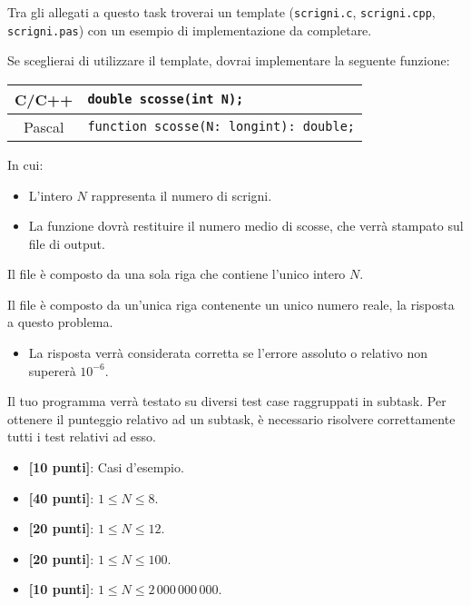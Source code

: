 \begin{warning}
Tra gli allegati a questo task troverai un template (\texttt{scrigni.c}, \texttt{scrigni.cpp}, \texttt{scrigni.pas}) con un esempio di implementazione da completare.
\end{warning}

Se sceglierai di utilizzare il template, dovrai implementare la seguente funzione:
\begin{center}\begin{tabularx}{\textwidth}{|c|X|}
\hline
C/C++  & \verb|double scosse(int N);|\\
\hline
Pascal & \verb|function scosse(N: longint): double;|\\
\hline
\end{tabularx}\end{center}
In cui:
\begin{itemize}[nolistsep]
  \item L'intero $N$ rappresenta il numero di scrigni.
  \item La funzione dovrà restituire il numero medio di scosse, che verrà stampato sul file di output.
\end{itemize}

\InputFile
Il file  è composto da una sola riga che contiene l'unico intero $N$.

\OutputFile
Il file \outputfile{} è composto da un'unica riga contenente un unico numero reale, la risposta a questo problema.

\pagebreak
\Constraints
\begin{itemize}[nolistsep, itemsep=2mm]
    \item La risposta verrà considerata corretta se l'errore assoluto o relativo non supererà $10^{-6}$.
\end{itemize}

\Scoring
Il tuo programma verrà testato su diversi test case raggruppati in subtask.
Per ottenere il punteggio relativo ad un subtask, è necessario risolvere
correttamente tutti i test relativi ad esso.

\begin{itemize}[nolistsep,itemsep=2mm]
  \item \textbf{ [10 punti]}: Casi d'esempio.
  \item \textbf{ [40 punti]}: $1 \le N \le 8$.
  \item \textbf{ [20 punti]}: $1 \le N \le 12$.
  \item \textbf{ [20 punti]}: $1 \le N \le 100$.
  \item \textbf{ [10 punti]}: $1 \le N \le 2\,000\,000\,000$.
\end{itemize}



\Examples
\begin{example}
%
%
\end{example}
